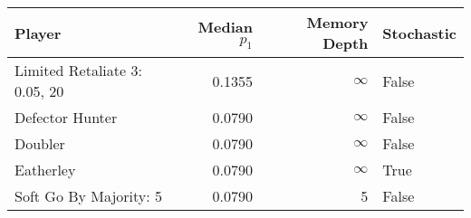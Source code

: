 \begin{tabular}{lrrl}
\toprule
                        Player &  Median $p_1$ &  Memory Depth & Stochastic \\
\midrule
 Limited Retaliate 3: 0.05, 20 &        0.1355 &            \(\infty\) &      False \\
               Defector Hunter &        0.0790 &            \(\infty\) &      False \\
                       Doubler &        0.0790 &            \(\infty\) &      False \\
                     Eatherley &        0.0790 &            \(\infty\) &       True \\
        Soft Go By Majority: 5 &        0.0790 &             5 &      False \\
\bottomrule
\end{tabular}
